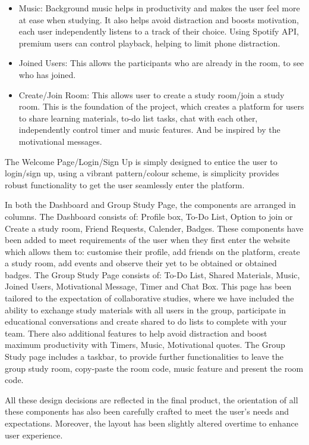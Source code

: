 \begin{itemize}
    \item Music: Background music helps in productivity and makes the user feel more at ease when studying. It also helps avoid distraction and boosts motivation, each user independently listens to a track of their choice. Using Spotify API, premium users can control playback, helping to limit phone distraction.
    \item Joined Users: This allows the participants who are already in the room, to see who has joined.
    \item Create/Join Room: This allows user to create a study room/join a study room. This is the foundation of the project, which creates a platform for users to share learning materials, to-do list tasks, chat with each other, independently control timer and  music features.  And be inspired by the motivational messages.

\end{itemize}

The Welcome Page/Login/Sign Up is simply designed to entice the user to login/sign up, using a vibrant pattern/colour scheme, is simplicity provides robust functionality to get the user seamlessly enter the platform.

In both the Dashboard and Group Study Page, the components are arranged in columns.
The Dashboard consists of: Profile box, To-Do List, Option to join or Create a study room, Friend Requests, Calender, Badges. These components have been added to meet requirements of the user when they first enter the website which allows them to: customise their profile, add friends on the platform, create a study room, add events and observe their yet to be obtained or obtained badges.
The Group Study Page consists of: To-Do List, Shared Materials, Music, Joined Users, Motivational Message, Timer and Chat Box. This page has been tailored to the expectation of collaborative studies, where we have included the ability to exchange study materials with all users in the group, participate in educational conversations and create shared to do lists to complete with your team. There also additional features to help avoid distraction and boost maximum productivity with Timers, Music, Motivational quotes.
The Group Study page includes a taskbar, to provide further functionalities to leave the group study room, copy-paste the room code, music feature and present the room code.

All these design decisions are reflected in the final product, the orientation of all these components has also been carefully crafted to meet the user's needs and expectations. Moreover, the layout has been slightly altered overtime to enhance user experience.



